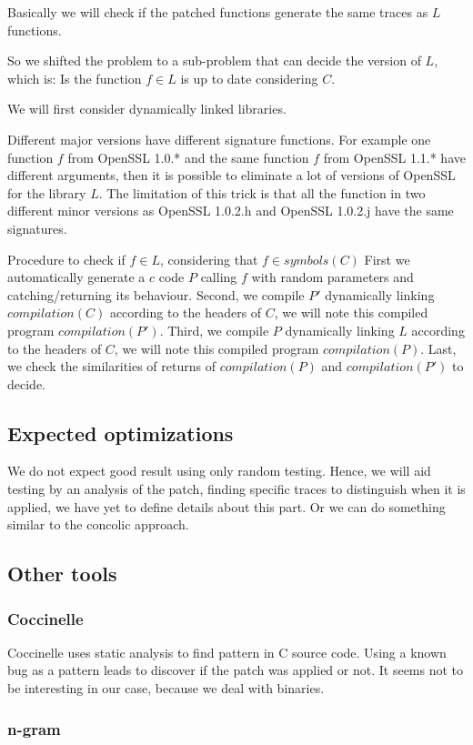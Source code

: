 \documentclass{article}
\newcommand{\symb}{{symbols}}
\newcommand{\comp}{{compilation}}
\begin{document}
    Basically we will check if the patched functions generate the same traces
    as $L$ functions.



    So we shifted the problem to a sub-problem that can decide the version of
    $L$, which is: Is the function $f \in L$ is up to date considering $C$.

    We will first consider dynamically linked libraries.
    
    Different major versions have different signature functions. For example one function $f$ from OpenSSL 1.0.* and the same function $f$ from OpenSSL 1.1.* have different arguments, then it is possible to eliminate a lot of versions of OpenSSL for the library $L$. The limitation of this trick is that all the function in two different minor versions as OpenSSL 1.0.2.h and OpenSSL 1.0.2.j have the same signatures.

    Procedure to check if $f \in L$, considering that $f \in \symb(C)$
    First we automatically generate a $c$ code $P$ calling $f$ with random
    parameters and catching/returning its behaviour. 
    Second, we compile $P'$ dynamically linking $\comp(C)$ according to the
    headers of $C$, we will note this compiled program $\comp(P')$. 
    Third, we compile $P$ dynamically linking $L$ according to the headers of
    $C$, we will note this compiled program $\comp(P)$. 
    Last, we check the similarities of returns of $\comp(P)$ and $\comp(P')$
    to decide.

    \subsection{Expected optimizations}
    We do not expect good result using only random testing. Hence, we will aid
    testing by an analysis of the patch, finding specific traces to
    distinguish when it is applied, we have yet to define details about this
    part. 
    Or we can do something similar to the concolic approach.
    
    
    \subsection{Other tools}

		\subsubsection{Coccinelle} 
			Coccinelle uses static analysis to find pattern in C source code. Using a known bug as a pattern leads to discover if the patch was applied or not. It seems not to be interesting in our case, because we deal with binaries.
		\subsubsection{n-gram}
\end{document}
